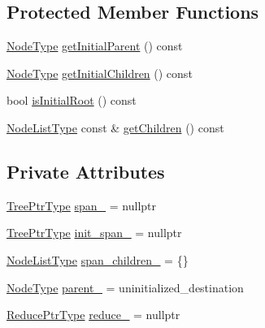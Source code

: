 \subsection*{Protected Member Functions}
\begin{DoxyCompactItemize}
\item 
\hyperlink{namespacevt_a866da9d0efc19c0a1ce79e9e492f47e2}{Node\+Type} \hyperlink{structvt_1_1group_1_1_group_collective_ac8af818af1d4d5c340690bafcdd733d6}{get\+Initial\+Parent} () const
\item 
\hyperlink{namespacevt_a866da9d0efc19c0a1ce79e9e492f47e2}{Node\+Type} \hyperlink{structvt_1_1group_1_1_group_collective_a6687873bb6e1cdb738fa037d415c2873}{get\+Initial\+Children} () const
\item 
bool \hyperlink{structvt_1_1group_1_1_group_collective_a7886a22a287c1a14ec107bdfc38d297e}{is\+Initial\+Root} () const
\item 
\hyperlink{structvt_1_1group_1_1_group_collective_a24ad1fd43cf03d5026de910d85c7ac96}{Node\+List\+Type} const  \& \hyperlink{structvt_1_1group_1_1_group_collective_af8bce31bef936e5a35b6463f26caf461}{get\+Children} () const
\end{DoxyCompactItemize}
\subsection*{Private Attributes}
\begin{DoxyCompactItemize}
\item 
\hyperlink{structvt_1_1group_1_1_group_collective_a2e02dc375f193620af9832f187029188}{Tree\+Ptr\+Type} \hyperlink{structvt_1_1group_1_1_group_collective_ab248625fa7ff84c1e9d9016f13b646c1}{span\+\_\+} = nullptr
\item 
\hyperlink{structvt_1_1group_1_1_group_collective_a2e02dc375f193620af9832f187029188}{Tree\+Ptr\+Type} \hyperlink{structvt_1_1group_1_1_group_collective_abf136fe4354c7e155189c3506f662c22}{init\+\_\+span\+\_\+} = nullptr
\item 
\hyperlink{structvt_1_1group_1_1_group_collective_a24ad1fd43cf03d5026de910d85c7ac96}{Node\+List\+Type} \hyperlink{structvt_1_1group_1_1_group_collective_a01dd5aa606799eadf3f72ca16c8c20bb}{span\+\_\+children\+\_\+} = \{\}
\item 
\hyperlink{namespacevt_a866da9d0efc19c0a1ce79e9e492f47e2}{Node\+Type} \hyperlink{structvt_1_1group_1_1_group_collective_aa7b4ba0f926e8201b567198d54bd5388}{parent\+\_\+} = uninitialized\+\_\+destination
\item 
\hyperlink{structvt_1_1group_1_1_group_collective_a55049a9850a6110ef8ad388a6b2adafc}{Reduce\+Ptr\+Type} \hyperlink{structvt_1_1group_1_1_group_collective_a9b3dbe2ce41faca03979a2cff8ee8342}{reduce\+\_\+} = nullptr
\end{DoxyCompactItemize}
